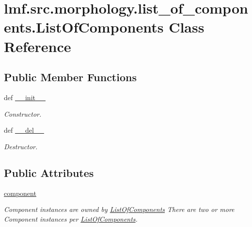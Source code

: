 \hypertarget{classlmf_1_1src_1_1morphology_1_1list__of__components_1_1_list_of_components}{\section{lmf.\+src.\+morphology.\+list\+\_\+of\+\_\+components.\+List\+Of\+Components Class Reference}
\label{classlmf_1_1src_1_1morphology_1_1list__of__components_1_1_list_of_components}
}
\subsection*{Public Member Functions}
\begin{DoxyCompactItemize}
\item 
def \hyperlink{classlmf_1_1src_1_1morphology_1_1list__of__components_1_1_list_of_components_a2f5197e9468d65a9bda951b7cee8b922}{\+\_\+\+\_\+init\+\_\+\+\_\+}
\begin{DoxyCompactList}\small\item\em Constructor. \end{DoxyCompactList}\item 
def \hyperlink{classlmf_1_1src_1_1morphology_1_1list__of__components_1_1_list_of_components_af1d3b99bc83eed991bffd96b3bbddfbc}{\+\_\+\+\_\+del\+\_\+\+\_\+}
\begin{DoxyCompactList}\small\item\em Destructor. \end{DoxyCompactList}\end{DoxyCompactItemize}
\subsection*{Public Attributes}
\begin{DoxyCompactItemize}
\item 
\hyperlink{classlmf_1_1src_1_1morphology_1_1list__of__components_1_1_list_of_components_aa78e1a406920652b7cdc1318a03c168d}{component}
\begin{DoxyCompactList}\small\item\em Component instances are owned by \hyperlink{classlmf_1_1src_1_1morphology_1_1list__of__components_1_1_list_of_components}{List\+Of\+Components} There are two or more Component instances per \hyperlink{classlmf_1_1src_1_1morphology_1_1list__of__components_1_1_list_of_components}{List\+Of\+Components}. \end{DoxyCompactList}\end{DoxyCompactItemize}


